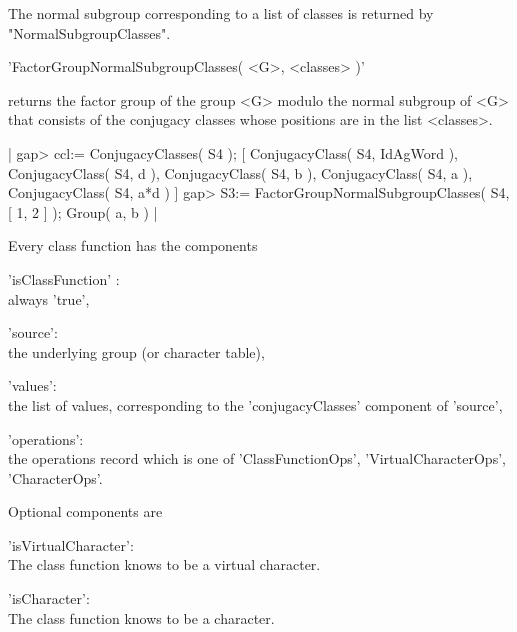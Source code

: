 The normal subgroup corresponding to a list of classes is returned by
"NormalSubgroupClasses".
    

'FactorGroupNormalSubgroupClasses( <G>, <classes> )'

returns the factor group of the group <G> modulo the normal subgroup of
<G> that consists of the conjugacy classes whose positions are in the
list <classes>.

|    gap> ccl:= ConjugacyClasses( S4 );
    [ ConjugacyClass( S4, IdAgWord ), ConjugacyClass( S4, d ), 
      ConjugacyClass( S4, b ), ConjugacyClass( S4, a ), 
      ConjugacyClass( S4, a*d ) ]
    gap> S3:= FactorGroupNormalSubgroupClasses( S4, [ 1, 2 ] );
    Group( a, b ) |
    

Every class function has the components

'isClassFunction' : \\  always 'true',

'source': \\  the underlying group (or character table),

'values': \\  the list of values, corresponding to the
              'conjugacyClasses' component of 'source',

'operations': \\ the operations record which is one of
                 'ClassFunctionOps', 'VirtualCharacterOps', 'CharacterOps'.

Optional components are

'isVirtualCharacter': \\ The class function knows to be a virtual
                         character.

'isCharacter': \\ The class function knows to be a character.

